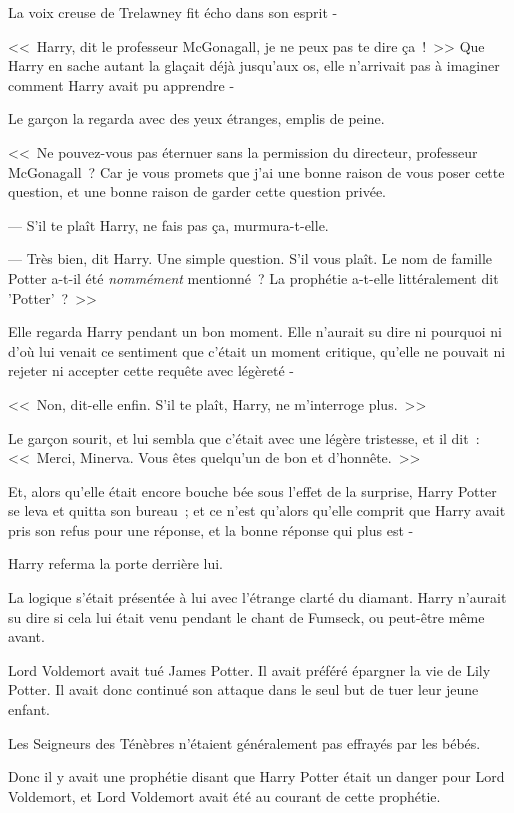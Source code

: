 La voix creuse de Trelawney fit écho dans son esprit -

<<~Harry, dit le professeur McGonagall, je ne peux pas te dire ça~!~>> Que Harry en sache autant la glaçait déjà jusqu'aux os, elle n'arrivait pas à imaginer comment Harry avait pu apprendre -

Le garçon la regarda avec des yeux étranges, emplis de peine.

<<~Ne pouvez-vous pas éternuer sans la permission du directeur, professeur McGonagall~? Car je vous promets que j'ai une bonne raison de vous poser cette question, et une bonne raison de garder cette question privée.

--- S'il te plaît Harry, ne fais pas ça, murmura-t-elle.

--- Très bien, dit Harry. Une simple question. S'il vous plaît. Le nom de famille Potter a-t-il été \emph{nommément} mentionné~? La prophétie a-t-elle littéralement dit 'Potter'~?~>>

Elle regarda Harry pendant un bon moment. Elle n'aurait su dire ni pourquoi ni d'où lui venait ce sentiment que c'était un moment critique, qu'elle ne pouvait ni rejeter ni accepter cette requête avec légèreté -

<<~Non, dit-elle enfin. S'il te plaît, Harry, ne m'interroge plus.~>>

Le garçon sourit, et lui sembla que c'était avec une légère tristesse, et il dit~: <<~Merci, Minerva. Vous êtes quelqu'un de bon et d'honnête.~>>

Et, alors qu'elle était encore bouche bée sous l'effet de la surprise, Harry Potter se leva et quitta son bureau~; et ce n'est qu'alors qu'elle comprit que Harry avait pris son refus pour une réponse, et la bonne réponse qui plus est -

Harry referma la porte derrière lui.

La logique s'était présentée à lui avec l'étrange clarté du diamant. Harry n'aurait su dire si cela lui était venu pendant le chant de Fumseck, ou peut-être même avant.

Lord Voldemort avait tué James Potter. Il avait préféré épargner la vie de Lily Potter. Il avait donc continué son attaque dans le seul but de tuer leur jeune enfant.

Les Seigneurs des Ténèbres n'étaient généralement pas effrayés par les bébés.

Donc il y avait une prophétie disant que Harry Potter était un danger pour Lord Voldemort, et Lord Voldemort avait été au courant de cette prophétie.

